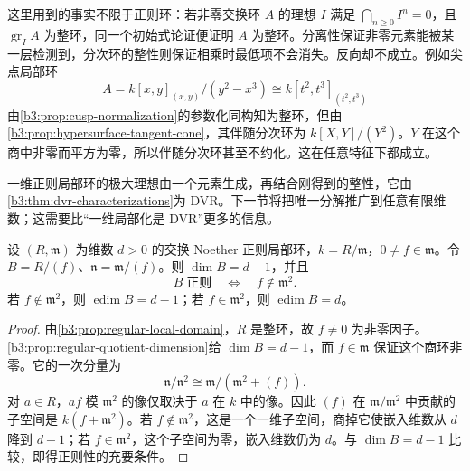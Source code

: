 这里用到的事实不限于正则环：若非零交换环 \(A\) 的理想 \(I\) 满足 \(\bigcap_{n\ge0}I^n=0\)，且 \(\operatorname{gr}_IA\) 为整环，同一个初始式论证便证明 \(A\) 为整环。分离性保证非零元素能被某一层检测到，分次环的整性则保证相乘时最低项不会消失。反向却不成立。例如尖点局部环
\[
	A=k[x,y]_{(x,y)}/(y^2-x^3) \cong k[t^2,t^3]_{(t^2,t^3)}
\]
由\cref{b3:prop:cusp-normalization}的参数化同构知为整环，但由\cref{b3:prop:hypersurface-tangent-cone}，其伴随分次环为 \(k[X,Y]/(Y^2)\)。\(Y\) 在这个商中非零而平方为零，所以伴随分次环甚至不约化。这在任意特征下都成立。

\ProseParagraphBreak
一维正则局部环的极大理想由一个元素生成，再结合刚得到的整性，它由\cref{b3:thm:dvr-characterizations}为 DVR。下一节将把唯一分解推广到任意有限维数；这需要比“一维局部化是 DVR”更多的信息。

\begin{proposition}\label{b3:prop:regular-hypersurface-criterion}
	设 \((R,\mathfrak m)\) 为维数 \(d>0\) 的交换 Noether 正则局部环，\(k=R/\mathfrak m\)，\(0\ne f\in\mathfrak m\)。令 \(B=R/(f)\)、\(\mathfrak n=\mathfrak m/(f)\)。则 \(\dim B=d-1\)，并且
	\[
		B\;\text{正则}\quad\Longleftrightarrow\quad f\notin\mathfrak m^2.
	\]
	若 \(f\notin\mathfrak m^2\)，则 \(\operatorname{edim}B=d-1\)；若 \(f\in\mathfrak m^2\)，则 \(\operatorname{edim}B=d\)。
\end{proposition}
\begin{proof}
	由\cref{b3:prop:regular-local-domain}，\(R\) 是整环，故 \(f\ne0\) 为非零因子。\cref{b3:prop:regular-quotient-dimension}给 \(\dim B=d-1\)，而 \(f\in\mathfrak m\) 保证这个商环非零。它的一次分量为
	\[
		\mathfrak n/\mathfrak n^2 \cong\mathfrak m/(\mathfrak m^2+(f)).
	\]
	对 \(a\in R\)，\(af\) 模 \(\mathfrak m^2\) 的像仅取决于 \(a\) 在 \(k\) 中的像。因此 \((f)\) 在 \(\mathfrak m/\mathfrak m^2\) 中贡献的子空间是 \(k(f+\mathfrak m^2)\)。若 \(f\notin\mathfrak m^2\)，这是一个一维子空间，商掉它使嵌入维数从 \(d\) 降到 \(d-1\)；若 \(f\in\mathfrak m^2\)，这个子空间为零，嵌入维数仍为 \(d\)。与 \(\dim B=d-1\) 比较，即得正则性的充要条件。
\end{proof}

